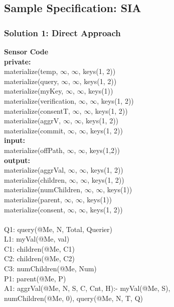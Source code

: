 \subsection{Sample Specification: SIA}

\subsubsection{Solution 1: Direct Approach}
\begin{code}
\textbf{Sensor Code}\\
\textbf{private:}\\
\> materialize(temp, $\infty$, $\infty$, keys(1, 2))\\
\> materialize(query, $\infty$, $\infty$, keys(1, 2))\\
\> materialize(myKey, $\infty$, $\infty$, keys(1))\\
\> materialize(verification, $\infty$, $\infty$, keys(1, 2))\\
\> materialize(consentT, $\infty$, $\infty$, keys(1, 2))\\
\> materialize(aggrV, $\infty$, $\infty$, keys(1, 2))\\
\> materialize(commit, $\infty$, $\infty$, keys(1, 2))\\
\textbf{input:}\\
\> materialize(offPath, $\infty$, $\infty$, keys(1,2))\\
\textbf{output:}\\
\> materialize(aggrVal, $\infty$, $\infty$, keys(1, 2))\\
\> materialize(children, $\infty$, $\infty$, keys(1, 2))\\
\> materialize(numChildren, $\infty$, $\infty$, keys(1))\\
\> materialize(parent, $\infty$, $\infty$, keys(1))\\
\> materialize(consent, $\infty$, $\infty$, keys(1, 2))\\
\\
Q1: query(@Me, N, Total, Querier)\\
L1: myVal(@Me, val)\\
C1: children(@Me, C1)\\
C2: children(@Me, C2)\\
C3: numChildren(@Me, Num)\\
P1: parent(@Me, P)\\
A1: aggrVal(@Me, N, S, C, Cnt, H):- myVal(@Me, S), \\
\> numChildren(@Me, 0), query(@Me, N, T, Q)\\

\end{code}
